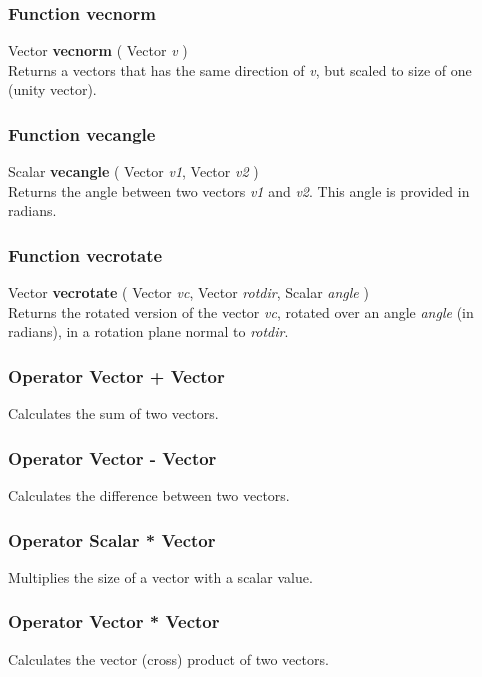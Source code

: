 \documentclass[10pt]{book}
\newcommand{\var}[1]{\textit{#1}}
\begin{document}
\subsubsection{Function vecnorm \label{F:vecnorm}}
Vector \textbf{vecnorm} ( Vector \textit{v} ) \\
Returns a vectors that has the same direction of \var{v}, but scaled to size of one (unity vector).

\subsubsection{Function vecangle \label{F:vecangle}}
Scalar \textbf{vecangle} ( Vector \textit{v1}, Vector \textit{v2} ) \\
Returns the angle between two vectors \var{v1} and \var{v2}. This angle is provided in radians.

\subsubsection{Function vecrotate \label{F:vecrotate}}
Vector \textbf{vecrotate} ( Vector \textit{vc}, Vector \textit{rotdir}, Scalar \textit{angle} ) \\
Returns the rotated version of the vector \var{vc}, rotated over an angle \var{angle} (in radians), in a rotation plane normal to \var{rotdir}.

\subsubsection{Operator Vector + Vector \label{O:Vector+Vector}}
Calculates the sum of two vectors.

\subsubsection{Operator Vector - Vector \label{O:Vector-Vector}}
Calculates the difference between two vectors.

\subsubsection{Operator Scalar * Vector \label{O:Scalar*Vector}}
Multiplies the size of a vector with a scalar value.

\subsubsection{Operator Vector * Vector \label{O:Vector*Vector}}
Calculates the vector (cross) product of two vectors.
\end{document}
